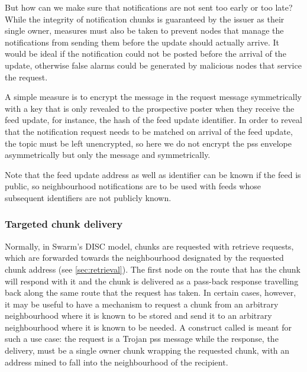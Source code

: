But how can we make sure that notifications are not sent too early or too late? While the integrity of notification chunks is guaranteed by the issuer as their single owner, measures must also be taken to prevent nodes that manage the notifications from sending them before the update should actually arrive. It would be ideal if the notification could not be posted before the arrival of the update, otherwise false alarms could be generated by malicious nodes that service the request.

A simple measure is to encrypt the message in the request  message symmetrically with a key that is only revealed to the prospective poster when they receive the feed update, for instance, the hash of the feed update identifier.
In order to reveal that the notification request needs to be matched on arrival of the feed update, the topic must be left unencrypted, so here we do not encrypt the pss envelope asymmetrically but only the message and symmetrically.

Note that the feed update address as well as identifier can be known if the feed is public, so neighbourhood notifications are to be used with feeds whose subsequent identifiers are not publicly known.

\subsubsection{Targeted chunk delivery}

Normally, in Swarm's DISC model, chunks are requested with retrieve requests, which are forwarded towards the neighbourhood designated by the requested chunk address (see \ref{sec:retrieval}). The first node on the route that has the chunk will respond with it and the chunk is delivered as a pass-back response travelling back along the same route that the request has taken. In certain cases, however, it may be useful to have a mechanism to request a chunk from an arbitrary neighbourhood where it is known to be stored and send it to an arbitrary neighbourhood where it is known to be needed. A construct called  is meant for such a use case: the request is a Trojan pss message while the response, the delivery, must be a single owner chunk wrapping the requested chunk, with an address mined to fall into the neighbourhood of the recipient.  


